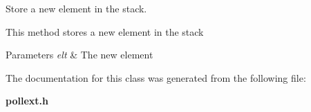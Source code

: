 Store a new element in the stack. 

This method stores a new element in the stack


\begin{DoxyParams}{Parameters}
{\em elt} & The new element \\
\hline
\end{DoxyParams}


The documentation for this class was generated from the following file\-:\begin{DoxyCompactItemize}
\item 
{\bf pollext.\-h}\end{DoxyCompactItemize}

